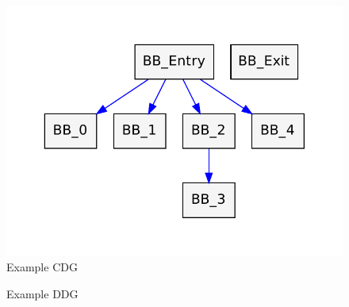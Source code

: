 \begin{figure}[p]
  \begin{center}
    \includegraphics{chap-examples/cdg.pdf}
  \end{center}
  \caption{Example CDG}
  \label{fig:cdg}
\end{figure}

\begin{figure}[p]
  \caption{Example DDG}
  \label{fig:ddg}
\end{figure}


